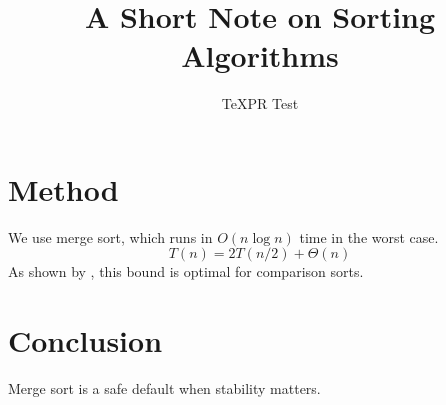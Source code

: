 \documentclass{article}
\title{A Short Note on Sorting Algorithms}
\author{TeXPR Test}
\begin{document}
\maketitle

\section{Method}
We use merge sort, which runs in $O(n \log n)$ time in the worst case.
\begin{equation}
  T(n) = 2T(n/2) + \Theta(n)
\end{equation}
As shown by \cite{knuth}, this bound is optimal for comparison sorts.
\section{Conclusion}
Merge sort is a safe default when stability matters.


\end{document}
